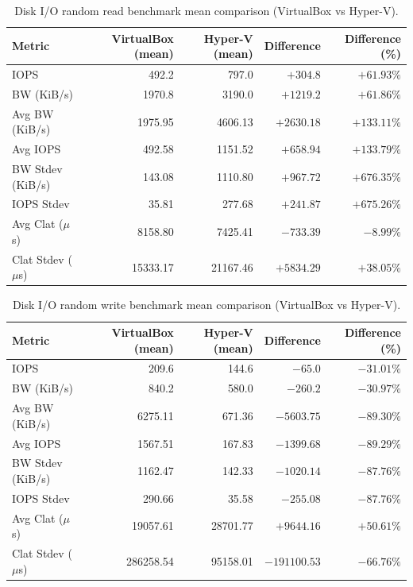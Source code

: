 \documentclass[a4paper, 12pt]{article}
\theoremstyle{plain}
\theoremstyle{definition}
\theoremstyle{remark}
\begin{document}
    \begin{table}[H]
    \centering
    \caption{Disk I/O random read benchmark mean comparison (VirtualBox vs Hyper-V).}
    \label{tab:io-read-compare}
    \begin{tabular}{lrrrr}
    \hline
    \textbf{Metric} & \textbf{VirtualBox (mean)} & \textbf{Hyper-V (mean)} & \textbf{Difference} & \textbf{Difference (\%)} \\
    \hline
    IOPS              & 492.2       & 797.0       & $+304.8$      & $+61.93\%$ \\
    BW (KiB/s)        & 1970.8      & 3190.0      & $+1219.2$     & $+61.86\%$ \\
    Avg BW (KiB/s)    & 1975.95     & 4606.13     & $+2630.18$    & $+133.11\%$ \\
    Avg IOPS          & 492.58      & 1151.52     & $+658.94$     & $+133.79\%$ \\
    BW Stdev (KiB/s)  & 143.08      & 1110.80     & $+967.72$     & $+676.35\%$ \\
    IOPS Stdev        & 35.81       & 277.68      & $+241.87$     & $+675.26\%$ \\
    Avg Clat ($\mu$s) & 8158.80     & 7425.41     & $-733.39$     & $-8.99\%$ \\
    Clat Stdev ($\mu$s) & 15333.17  & 21167.46    & $+5834.29$    & $+38.05\%$ \\
    \hline
    \end{tabular}
    \end{table}

    \begin{table}[H]
    \centering
    \caption{Disk I/O random write benchmark mean comparison (VirtualBox vs Hyper-V).}
    \label{tab:io-write-compare}
    \begin{tabular}{lrrrr}
    \hline
    \textbf{Metric} & \textbf{VirtualBox (mean)} & \textbf{Hyper-V (mean)} & \textbf{Difference} & \textbf{Difference (\%)} \\
    \hline
    IOPS              & 209.6       & 144.6       & $-65.0$       & $-31.01\%$ \\
    BW (KiB/s)        & 840.2       & 580.0       & $-260.2$      & $-30.97\%$ \\
    Avg BW (KiB/s)    & 6275.11     & 671.36      & $-5603.75$    & $-89.30\%$ \\
    Avg IOPS          & 1567.51     & 167.83      & $-1399.68$    & $-89.29\%$ \\
    BW Stdev (KiB/s)  & 1162.47     & 142.33      & $-1020.14$    & $-87.76\%$ \\
    IOPS Stdev        & 290.66      & 35.58       & $-255.08$     & $-87.76\%$ \\
    Avg Clat ($\mu$s) & 19057.61    & 28701.77    & $+9644.16$    & $+50.61\%$ \\
    Clat Stdev ($\mu$s) & 286258.54 & 95158.01    & $-191100.53$  & $-66.76\%$ \\
    \hline
    \end{tabular}
    \end{table}
\end{document}
